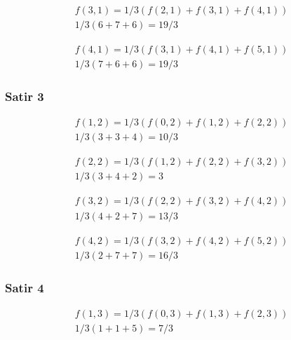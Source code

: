 \documentclass[12pt]{article}
\begin{document}
\begin{equation}
\begin{split}
f(3,1) = 1/3 (f(2,1)+f(3,1)+f(4,1)) \\
1/3 (6+7+6) = 19/3 
\end{split}
\end{equation}

\begin{equation}
\begin{split}
f(4,1) = 1/3 (f(3,1)+f(4,1)+f(5,1)) \\
1/3 (7+6+6) = 19/3
\end{split}
\end{equation}

\subsubsection{Satir 3}

\begin{equation}
\begin{split}
f(1,2) = 1/3 (f(0,2)+f(1,2)+f(2,2)) \\
1/3 (3+3+4) = 10/3
\end{split}
\end{equation}

\begin{equation}
\begin{split}
f(2,2) = 1/3 (f(1,2)+f(2,2)+f(3,2)) \\
1/3 (3+4+2) = 3
\end{split}
\end{equation}

\begin{equation}
\begin{split}
f(3,2) = 1/3 (f(2,2)+f(3,2)+f(4,2)) \\
1/3 (4+2+7) = 13/3 
\end{split}
\end{equation}

\begin{equation}
\begin{split}
f(4,2) = 1/3 (f(3,2)+f(4,2)+f(5,2)) \\
1/3 (2+7+7) = 16/3
\end{split}
\end{equation}

\subsubsection{Satir 4}

\begin{equation}
\begin{split}
f(1,3) = 1/3 (f(0,3)+f(1,3)+f(2,3)) \\
1/3 (1+1+5) = 7/3
\end{split}
\end{equation}
\end{document}
